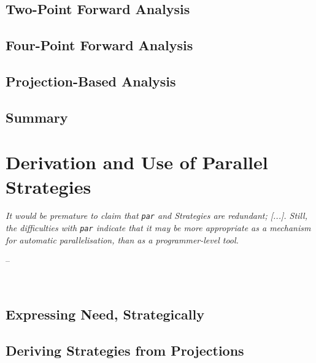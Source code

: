 \documentclass[openright, dottedtoc, headinclude, footinclude=true, a4paper, numbers=noenddot]{scrreprt}
\makeatletter
\newenvironment{chapquote}[2][2em]
  {\setlength{\@tempdima}{#1}%
   \def\chapquote@author{#2}%
   \parshape 1 \@tempdima \dimexpr\textwidth-2\@tempdima\relax%
   \itshape}
  {\par\normalfont\hfill--\ \chapquote@author\hspace*{\@tempdima}\par\noindent\hrulefill\\[1cm]}
\makeatother
\begin{document}
        \section{Two-Point Forward Analysis}
        \label{sec:twoPoint}
        
    
        \section{Four-Point Forward Analysis}
        \label{sec:fourPoint}
        
    
        \section{Projection-Based Analysis}
        \label{sec:projections}
        

        \section{Summary}
        \label{sec:summ2}
        

    \chapter{Derivation and Use of Parallel Strategies}
    \label{chap:derivation}
    \begin{chapquote}{\cite{marlow2011monad}}
    It would be premature to claim that \verb'par' and Strategies are redundant;
    [...]. Still, the difficulties with \verb'par' indicate that it may be more
    appropriate as a mechanism for automatic parallelisation, than as a
    programmer-level tool.
    \end{chapquote}
    

        \section{Expressing Need, Strategically}
        \label{sec:expressingNeed}
        

        \section{Deriving Strategies from Projections}
        \label{sec:derivation}
        
\end{document}

